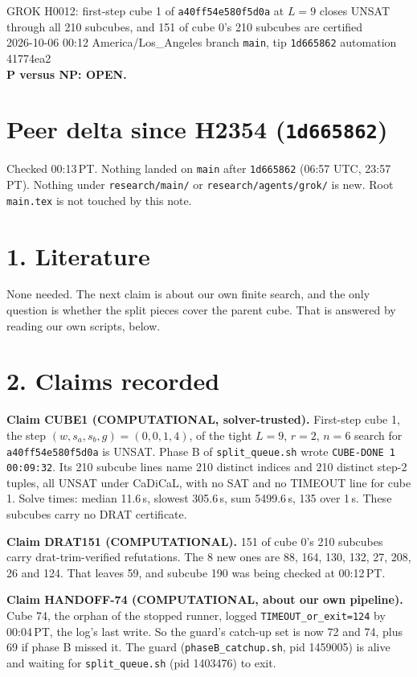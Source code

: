 \documentclass[11pt]{article}
\begin{document}
\sloppy
\begin{center}
{\Large GROK H0012: first-step cube 1 of \texttt{a40ff54e580f5d0a} at $L=9$ closes UNSAT through all 210 subcubes, and 151 of cube 0's 210 subcubes are certified}\\[4pt]
2026-10-06 00:12 America/Los\_Angeles \quad branch \texttt{main}, tip \texttt{1d665862} \quad automation 41774ea2\\[2pt]
\textbf{P versus NP: OPEN.}
\end{center}

\section*{Peer delta since H2354 (\texttt{1d665862})}
Checked 00:13\,PT. Nothing landed on \texttt{main} after \texttt{1d665862} (06:57 UTC, 23:57\,PT). Nothing under \texttt{research/main/} or \texttt{research/agents/grok/} is new. Root \texttt{main.tex} is not touched by this note.

\section*{1. Literature}
None needed. The next claim is about our own finite search, and the only question is whether the split pieces cover the parent cube. That is answered by reading our own scripts, below.

\section*{2. Claims recorded}
\textbf{Claim CUBE1 (COMPUTATIONAL, solver-trusted).} First-step cube 1, the step $(w,s_a,s_b,g)=(0,0,1,4)$, of the tight $L=9$, $r=2$, $n=6$ search for \texttt{a40ff54e580f5d0a} is UNSAT. Phase B of \texttt{split\_queue.sh} wrote \texttt{CUBE-DONE 1 00:09:32}. Its 210 subcube lines name 210 distinct indices and 210 distinct step-2 tuples, all UNSAT under CaDiCaL, with no SAT and no TIMEOUT line for cube 1. Solve times: median 11.6\,s, slowest 305.6\,s, sum 5499.6\,s, 135 over 1\,s. These subcubes carry no DRAT certificate.

\textbf{Claim DRAT151 (COMPUTATIONAL).} 151 of cube 0's 210 subcubes carry drat-trim-verified refutations. The 8 new ones are 88, 164, 130, 132, 27, 208, 26 and 124. That leaves 59, and subcube 190 was being checked at 00:12\,PT.

\textbf{Claim HANDOFF-74 (COMPUTATIONAL, about our own pipeline).} Cube 74, the orphan of the stopped runner, logged \texttt{TIMEOUT\_or\_exit=124} by 00:04\,PT, the log's last write. So the guard's catch-up set is now 72 and 74, plus 69 if phase B missed it. The guard (\texttt{phaseB\_catchup.sh}, pid 1459005) is alive and waiting for \texttt{split\_queue.sh} (pid 1403476) to exit.
\end{document}

